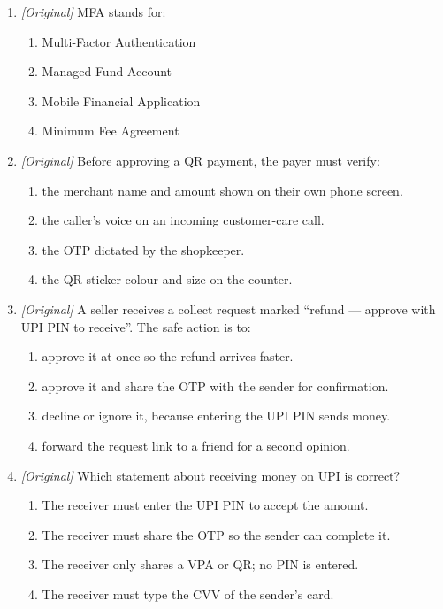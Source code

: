 \documentclass[11pt]{article}
\begin{document}
\begin{enumerate}[label=\textbf{Q\arabic*.}, leftmargin=*]
\item \textit{[Original]} MFA stands for:
  \begin{enumerate}[label=\Alph*.]
    \item Multi-Factor Authentication
    \item Managed Fund Account
    \item Mobile Financial Application
    \item Minimum Fee Agreement
  \end{enumerate}
\item \textit{[Original]} Before approving a QR payment, the payer must
  verify:
  \begin{enumerate}[label=\Alph*.]
    \item the merchant name and amount shown on their own phone screen.
    \item the caller's voice on an incoming customer-care call.
    \item the OTP dictated by the shopkeeper.
    \item the QR sticker colour and size on the counter.
  \end{enumerate}
\item \textit{[Original]} A seller receives a collect request marked
  ``refund --- approve with UPI PIN to receive''. The safe action is to:
  \begin{enumerate}[label=\Alph*.]
    \item approve it at once so the refund arrives faster.
    \item approve it and share the OTP with the sender for confirmation.
    \item decline or ignore it, because entering the UPI PIN sends money.
    \item forward the request link to a friend for a second opinion.
  \end{enumerate}
\item \textit{[Original]} Which statement about receiving money on UPI is
  correct?
  \begin{enumerate}[label=\Alph*.]
    \item The receiver must enter the UPI PIN to accept the amount.
    \item The receiver must share the OTP so the sender can complete it.
    \item The receiver only shares a VPA or QR; no PIN is entered.
    \item The receiver must type the CVV of the sender's card.
  \end{enumerate}

\end{enumerate}
\end{document}
